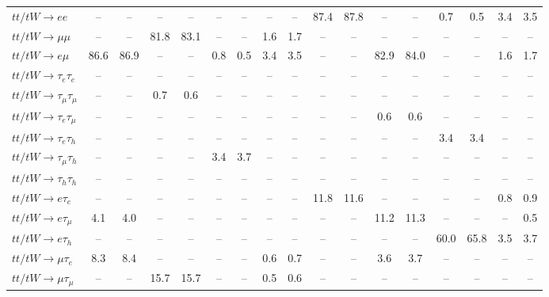 \begin{sidewaystable}[p]
\begin{tabular}{|l|cc|cc|cc|cc|cc|cc|cc|cc|}
    $tt/tW \to ee$                     &   -- &   -- &   -- &   -- &   -- &   -- &   -- &   -- & 87.4 & 87.8 &   -- &   -- &  0.7 &  0.5 &  3.4 &  3.5 \\ 
    $tt/tW \to \mu\mu$                 &   -- &   -- & 81.8 & 83.1 &   -- &   -- &  1.6 &  1.7 &   -- &   -- &   -- &   -- &   -- &   -- &   -- &   -- \\ 
    $tt/tW \to e\mu$                   & 86.6 & 86.9 &   -- &   -- &  0.8 &  0.5 &  3.4 &  3.5 &   -- &   -- & 82.9 & 84.0 &   -- &   -- &  1.6 &  1.7 \\ 
    $tt/tW \to \tau_{e}\tau_{e}$       &   -- &   -- &   -- &   -- &   -- &   -- &   -- &   -- &   -- &   -- &   -- &   -- &   -- &   -- &   -- &   -- \\ 
    $tt/tW \to \tau_{\mu}\tau_{\mu}$   &   -- &   -- &  0.7 &  0.6 &   -- &   -- &   -- &   -- &   -- &   -- &   -- &   -- &   -- &   -- &   -- &   -- \\ 
    $tt/tW \to \tau_{e}\tau_{\mu}$     &   -- &   -- &   -- &   -- &   -- &   -- &   -- &   -- &   -- &   -- &  0.6 &  0.6 &   -- &   -- &   -- &   -- \\ 
    $tt/tW \to \tau_{e}\tau_{h}$       &   -- &   -- &   -- &   -- &   -- &   -- &   -- &   -- &   -- &   -- &   -- &   -- &  3.4 &  3.4 &   -- &   -- \\ 
    $tt/tW \to \tau_{\mu}\tau_{h}$     &   -- &   -- &   -- &   -- &  3.4 &  3.7 &   -- &   -- &   -- &   -- &   -- &   -- &   -- &   -- &   -- &   -- \\ 
    $tt/tW \to \tau_{h}\tau_{h}$       &   -- &   -- &   -- &   -- &   -- &   -- &   -- &   -- &   -- &   -- &   -- &   -- &   -- &   -- &   -- &   -- \\ 
    $tt/tW \to e\tau_{e}$              &   -- &   -- &   -- &   -- &   -- &   -- &   -- &   -- & 11.8 & 11.6 &   -- &   -- &   -- &   -- &  0.8 &  0.9 \\ 
    $tt/tW \to e\tau_{\mu}$            &  4.1 &  4.0 &   -- &   -- &   -- &   -- &   -- &   -- &   -- &   -- & 11.2 & 11.3 &   -- &   -- &   -- &  0.5 \\ 
    $tt/tW \to e\tau_{h}$              &   -- &   -- &   -- &   -- &   -- &   -- &   -- &   -- &   -- &   -- &   -- &   -- & 60.0 & 65.8 &  3.5 &  3.7 \\ 
    $tt/tW \to \mu\tau_{e}$            &  8.3 &  8.4 &   -- &   -- &   -- &   -- &  0.6 &  0.7 &   -- &   -- &  3.6 &  3.7 &   -- &   -- &   -- &   -- \\ 
    $tt/tW \to \mu\tau_{\mu}$          &   -- &   -- & 15.7 & 15.7 &   -- &   -- &  0.5 &  0.6 &   -- &   -- &   -- &   -- &   -- &   -- &   -- &   -- \\ 

\end{tabular}
\end{sidewaystable}
